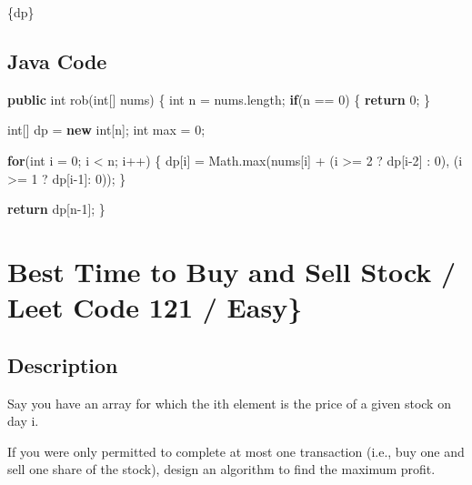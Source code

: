\documentclass[]{book}
\newenvironment{Shaded}{\begin{snugshade}}{\end{snugshade}}
\newcommand{\BuiltInTok}[1]{#1}
\newcommand{\DataTypeTok}[1]{\textcolor[rgb]{0.13,0.29,0.53}{#1}}
\newcommand{\DecValTok}[1]{\textcolor[rgb]{0.00,0.00,0.81}{#1}}
\newcommand{\FunctionTok}[1]{\textcolor[rgb]{0.00,0.00,0.00}{#1}}
\newcommand{\KeywordTok}[1]{\textcolor[rgb]{0.13,0.29,0.53}{\textbf{#1}}}
\newcommand{\NormalTok}[1]{#1}
\begin{document}
\{dp\}

\hypertarget{java-code-28}{%
\subsection{Java Code}\label{java-code-28}}

\begin{Shaded}
\begin{Highlighting}[]
\KeywordTok{public} \DataTypeTok{int} \FunctionTok{rob}\NormalTok{(}\DataTypeTok{int}\NormalTok{[] nums) \{}
    \DataTypeTok{int}\NormalTok{ n = nums.}\FunctionTok{length}\NormalTok{;}
    \KeywordTok{if}\NormalTok{(n == }\DecValTok{0}\NormalTok{) \{}
        \KeywordTok{return} \DecValTok{0}\NormalTok{;}
\NormalTok{    \}}

    \DataTypeTok{int}\NormalTok{[] dp = }\KeywordTok{new} \DataTypeTok{int}\NormalTok{[n];}
    \DataTypeTok{int}\NormalTok{ max = }\DecValTok{0}\NormalTok{;}

    \KeywordTok{for}\NormalTok{(}\DataTypeTok{int}\NormalTok{ i = }\DecValTok{0}\NormalTok{; i < n; i++) \{}
\NormalTok{        dp[i] = }\BuiltInTok{Math}\NormalTok{.}\FunctionTok{max}\NormalTok{(nums[i] + (i >= }\DecValTok{2}\NormalTok{ ? dp[i}\DecValTok{-2}\NormalTok{] : }\DecValTok{0}\NormalTok{), (i >= }\DecValTok{1}\NormalTok{ ? dp[i}\DecValTok{-1}\NormalTok{]: }\DecValTok{0}\NormalTok{));}
\NormalTok{    \}}

    \KeywordTok{return}\NormalTok{ dp[n}\DecValTok{-1}\NormalTok{];}
\NormalTok{\}}
\end{Highlighting}
\end{Shaded}

\hypertarget{best-time-to-buy-and-sell-stock-leet-code-121-easy}{%
\section{Best Time to Buy and Sell Stock / Leet Code 121 / Easy\}}\label{best-time-to-buy-and-sell-stock-leet-code-121-easy}}

\hypertarget{description-33}{%
\subsection{Description}\label{description-33}}

Say you have an array for which the ith element is the price of a given stock on day i.

If you were only permitted to complete at most one transaction (i.e., buy one and sell one share of the stock),
design an algorithm to find the maximum profit.
\end{document}
